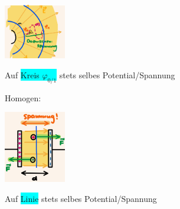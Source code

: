 \vspace{-1mm}
    \begin{minipage}{0.41\linewidth}
        \begin{footnotesize}
            \begin{center}
                \vspace{2mm}
                \includegraphics[width = 27mm]{src/images/inhom_potentialfeld.png}
            \end{center}
        \end{footnotesize}
    \end{minipage}
    \begin{minipage}{0.58\linewidth}
        \begin{scriptsize}
            \begin{center}
                Auf \colorbox{Cyan}{Kreis $\varphi_{0/1}$} stets selbes Potential/Spannung
            \end{center}
        \end{scriptsize}
    \end{minipage}
    \vspace{1mm}
\newpage
Homogen:

\vspace{-1mm}
    \begin{minipage}{0.41\linewidth}
        \begin{footnotesize}
            \begin{center}
                \vspace{2mm}
                \includegraphics[width = 27mm]{src/images/hom_potentialfeld.png}
            \end{center}
        \end{footnotesize}
    \end{minipage}
    \begin{minipage}{0.58\linewidth}
        \begin{scriptsize}
            \begin{center}
                Auf \colorbox{Cyan}{Linie} stets selbes Potential/Spannung
            \end{center}
        \end{scriptsize}
    \end{minipage}
    \vspace{1mm}